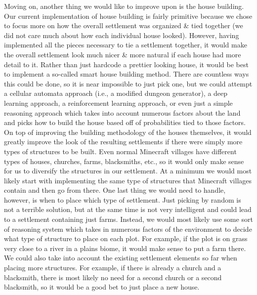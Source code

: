 \documentclass[11pt, oneside]{article}
\begin{document}
\begin{normalsize}
Moving on, another thing we would like to improve upon is the house building. 
Our current implementation of house building is fairly primitive because we chose to focus more on how the overall settlement was organized \& tied together (we did not care much about how each individual house looked).
However, having implemented all the pieces necessary to tie a settlement together, it would make the overall settlement look much nicer \& more natural if each house had more detail to it. 
Rather than just hardcode a prettier looking house, it would be best to implement a so-called smart house building method. 
There are countless ways this could be done, so it is near impossible to just pick one, but we could attempt a cellular automata approach (i.e., a modified dungeon generator), a deep learning approach, a reinforcement learning approach, or even just a simple reasoning approach which takes into account numerous factors about the land and picks how to build the house based off of probabilities tied to those factors. 
On top of improving the building methodology of the houses themselves, it would greatly improve the look of the resulting settlements if there were simply more types of structures to be built. 
Even normal Minecraft villages have different types of houses, churches, farms, blacksmiths, etc., so it would only make sense for us to diversify the structures in our settlement. 
At a minimum we would most likely start with implementing the same type of structures that Minecraft villages contain and then go from there. 
One last thing we would need to handle, however, is when to place which type of settlement. 
Just picking by random is not a terrible solution, but at the same time is not very intelligent and could lead to a settlement containing just farms. 
Instead, we would most likely use some sort of reasoning system which takes in numerous factors of the environment to decide what type of structure to place on each plot. 
For example, if the plot is on grass very close to a river in a plains biome, it would make sense to put a farm there.
We could also take into account the existing settlement elements so far when placing more structures. 
For example, if there is already a church and a blacksmith, there is most likely no need for a second church or a second blacksmith, so it would be a good bet to just place a new house. 


\end{normalsize}
\end{document}
